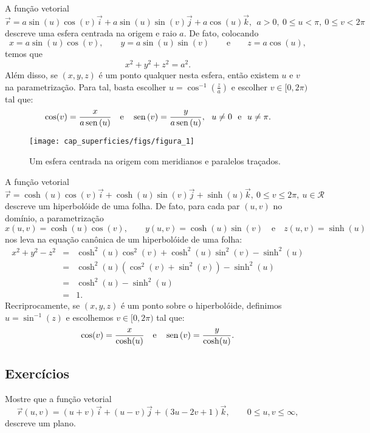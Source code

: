\begin{ex}A função vetorial
$$
\vec{r}=a\sin(u)\cos(v)\vec{i}+a\sin(u)\sin(v)\vec{j}+a\cos(u)\vec{k},~~ a>0, ~ 0\leq u< \pi, ~ 0\leq v< 2\pi
$$
descreve uma esfera centrada na origem e raio $a$. De fato, colocando $$x=a\sin(u)\cos(v),\qquad y=a\sin(u)\sin(v)\qquad\text{e}\qquad z=a\cos(u),$$
temos que
$$
x^2+y^2+z^2=a^2.
$$
Além disso, se $(x,y,z)$ é um ponto qualquer nesta esfera, então existem $u$ e $v$ na parametrização. Para tal, basta escolher $u=\cos^{-1}\left(\frac{z}{a}\right)$ e escolher $v\in[0,2\pi)$ tal que:
$$\cos(v)=\frac{x}{a\sin(u)} \quad \hbox{e} \quad \sin(v)=\frac{y}{a\sin(u)},~~u\neq 0 ~~ \hbox{e} ~~u\neq \pi.$$

 \begin{figure}%
\centering
 \texttt{[image: cap\_superficies/figs/figura\_1]}\label{cap_superficies_esfera}
\caption{Um esfera centrada na origem com meridianos e paralelos traçados.}
\end{figure}
\end{ex}

\begin{ex}A função vetorial
 $$
 \vec{r}=\cosh(u)\cos( v)\vec{i}+ \cosh(u)\sin(v)\vec{j}+\sinh(u)\vec{k},\ 0\leq v\leq 2\pi,\ u\in\mathcal{R}
 $$
 descreve um hiperbolóide de uma folha. De fato, para cada par $(u,v)$ no domínio, a parametrização
 $$
 x(u,v)=\cosh(u)\cos(v),\qquad y(u,v)=\cosh(u)\sin(v)\quad\text{e}\quad z(u,v)=\sinh(u)
 $$
 nos leva na equação canônica de um hiperbolóide de uma folha:
 \begin{eqnarray*}
 x^2+y^2-z^2&=&\cosh^2(u)\cos^2(v)+\cosh^2(u)\sin^2(v)-\sinh^2(u)  \\
 &=&\cosh^2(u)(\cos^2(v)+\sin^2(v))-\sinh^2(u)  \\
 &=&\cosh^2(u)-\sinh^2(u)  \\
 &=&1.
 \end{eqnarray*}
Recriprocamente, se $(x,y,z)$ é um ponto sobre o hiperbolóide, definimos $u=\sin^{-1}(z)$ e escolhemos $v\in[0,2\pi)$ tal que:
$$\cos(v)=\frac{x}{\cosh(u)} \quad \hbox{e} \quad \sin(v)=\frac{y}{\cosh(u)}.$$
 \end{ex}
 
 \subsection*{Exercícios}
 \begin{exer}Mostre que a função vetorial
  $$
  \vec{r}(u,v)=(u+v)\vec{i}+(u-v)\vec{j}+(3u-2v+1)\vec{k}, \qquad 0\leq u,v\leq \infty,
  $$
  descreve um plano.
 \end{exer}

